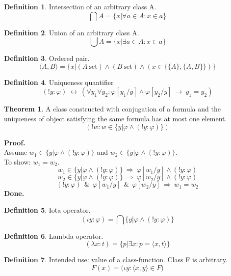 \documentclass[10pt,a4paper]{article}
\theoremstyle{definition}
\newtheorem{definition}{Definition}[section]
\newtheorem{theorem}{Theorem}[section]
\newcommand{\AND}{\ \ \&\ \ }
\newcommand{\Done}{\noindent \textbf{Done.}\\}
\newcommand{\IFF}{\ \Longleftrightarrow\ }
\renewcommand{\iff}{\ \longleftrightarrow\ }
\newcommand{\IMPLIES}{\ \Longrightarrow\ }
\renewcommand{\implies}{\ \longrightarrow\ }
\newcommand{\intersection}{\bigcap}
\newcommand{\Proof}{\noindent \textbf{Proof.}\\}
\newcommand{\set}{\mathrm{\ set}}
\newcommand{\union}{\bigcup}
\begin{document}
\begin{definition}
\label{def:intersection}
Intersection of an arbitrary class A.
\[
\intersection A = \{x|\forall a\in A: x\in a\}
\]
\end{definition}

\begin{definition}
\label{def:union}
Union of an arbitrary class A.
\[
\union A = \{x|\exists a\in A: x\in a\}
\]
\end{definition}

\begin{definition}
\label{def:ordered pair}
Ordered pair. %
\[
\langle A,B \rangle=\{x|(A\set)\land(B\set)\land (x\in\{\{A\},\{A,B\}\})\}
\]
\end{definition}

\begin{definition}
\label{def:uniqueness quantifier}
Uniqueness quantifier
\[
(!y:\varphi)\iff (\forall y_1\forall y_2:\varphi[y_1/y]\land\varphi[y_2/y]\implies y_1=y_2)
\]
\end{definition}

\begin{theorem}
A class constructed with conjugation of a formula and the uniqueness of object satisfying the same formula has at most one element.
\label{thm:class with at most one object}
\[
(!w:w\in \{y|\varphi\land (!y:\varphi)\})
\]
\end{theorem}
\Proof
Assume $w_1\in \{y|\varphi\land (!y:\varphi)\}$ and $w_2\in \{y|\varphi\land (!y:\varphi)\}$.\\
To show: $w_1=w_2$.
\[
w_1\in \{y|\varphi\land (!y:\varphi)\}
\IMPLIES
\varphi[w_1/y]
\land
(!y:\varphi)
\]
\[
w_2\in \{y|\varphi\land (!y:\varphi)\}
\IMPLIES
\varphi[w_2/y]
\land
(!y:\varphi)
\]
\[
(!y:\varphi)
\AND
\varphi[w_1/y]
\AND
\varphi[w_2/y]
\IMPLIES
w_1=w_2
\]
\Done

\begin{definition}
\label{def:iota operator}
Iota operator.
\[
(\iota y: \varphi) = \intersection \{y|\varphi \land (!y:\varphi)\}
\]
\end{definition}

\begin{definition}
\label{def:lambda operator}
Lambda operator.
\[
(\lambda x: t) = \{p|\exists x: p = \langle x,t \rangle\}
\]
\end{definition}


\begin{definition}
\label{def:value}
Intended use: value of a class-function. Class F is arbitrary.
\[
F(x) = \big(\iota y: \langle x,y\rangle\in F\big)
\]
\end{definition}
\end{document}
